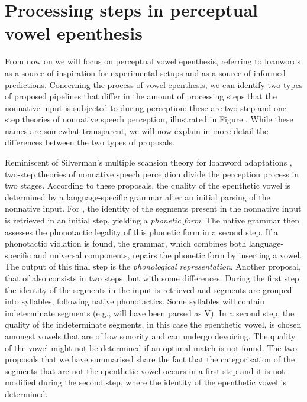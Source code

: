 \section{Processing steps in perceptual vowel epenthesis}

From now on we will focus on perceptual vowel epenthesis, referring to loanwords as a source of inspiration for experimental setups and as a source of informed predictions. Concerning the process of vowel epenthesis, we can identify two types of proposed pipelines that differ in the amount of processing steps that the nonnative input is subjected to during perception: these are two-step and one-step theories of nonnative speech perception, illustrated in Figure \label{ref:intro_12step}. While these names are somewhat transparent, we will now explain in more detail the differences between the two types of proposals.   

Reminiscent of Silverman's multiple scansion theory for loanword adaptations \cite{silverman1992}, two-step theories of nonnative speech perception divide the perception process in two stages. According to these proposals, the quality of the epenthetic vowel is determined by a language-specific grammar after an initial parsing of the nonnative input.
For \cite{berent2007}, the identity of the segments present in the nonnative input is retrieved in an initial step, yielding a \textit{phonetic form}. The native grammar then assesses the phonotactic legality of this phonetic form in a second step. If a phonotactic violation is found, the grammar, which combines both language-specific and universal components, repairs the phonetic form by inserting a vowel. The output of this final step is the \textit{phonological representation}.
Another proposal, that of \cite{monahan2009} also consists in two steps, but with some differences. During the first step the identity of the segments in the input is retrieved and segments are grouped into syllables, following native phonotactics. Some syllables will contain indeterminate segments (e.g.,  will have been parsed as V). In a second step, the quality of the indeterminate segments, in this case the epenthetic vowel, is chosen amongst vowels that are of low sonority and can undergo devoicing. The quality of the vowel might not be determined if an optimal match is not found.
The two proposals that we have summarised share the fact that the categorisation of the segments that are not the epenthetic vowel occurs in a first step and it is not modified during the second step, where the identity of the epenthetic vowel is determined.

